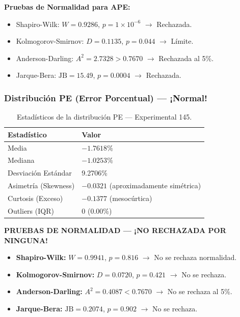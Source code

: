 \documentclass{article}
\begin{document}
\textbf{Pruebas de Normalidad para APE:}
\begin{itemize}
\item Shapiro-Wilk: $W = 0.9286$, $p = 1 \times 10^{-6}$ $\rightarrow$ Rechazada.
\item Kolmogorov-Smirnov: $D = 0.1135$, $p = 0.044$ $\rightarrow$ Límite.
\item Anderson-Darling: $A^2 = 2.7328 > 0.7670$ $\rightarrow$ Rechazada al 5\%.
\item Jarque-Bera: $\text{JB} = 15.49$, $p = 0.0004$ $\rightarrow$ Rechazada.
\end{itemize}

\subsubsection{Distribución PE (Error Porcentual) — \texorpdfstring{¡Normal!}{¡Normal!}}

\begin{table}[htbp]
\centering
\caption{Estadísticos de la distribución PE — Experimental 145.}
\label{tab:exp145-pe}
\begin{tabular}{ll}
\hline
Estadístico & Valor \\
\hline
Media                        & $-1.7618\%$ \\
Mediana                      & $-1.0253\%$ \\
Desviación Estándar          & 9.2706\% \\
Asimetría (Skewness)         & $-0.0321$ (aproximadamente simétrica) \\
Curtosis (Exceso)            & $-0.1377$ (mesocúrtica) \\
Outliers (IQR)               & 0 (0.00\%) \\
\hline
\end{tabular}
\end{table}

\textbf{PRUEBAS DE NORMALIDAD — ¡NO RECHAZADA POR NINGUNA!}
\begin{itemize}
\item \textbf{Shapiro-Wilk:} $W = 0.9941$, $p = 0.816$ $\rightarrow$ No se rechaza normalidad.
\item \textbf{Kolmogorov-Smirnov:} $D = 0.0720$, $p = 0.421$ $\rightarrow$ No se rechaza.
\item \textbf{Anderson-Darling:} $A^2 = 0.4087 < 0.7670$ $\rightarrow$ No se rechaza al 5\%.
\item \textbf{Jarque-Bera:} $\text{JB} = 0.2074$, $p = 0.902$ $\rightarrow$ No se rechaza.
\end{itemize}
\end{document}
